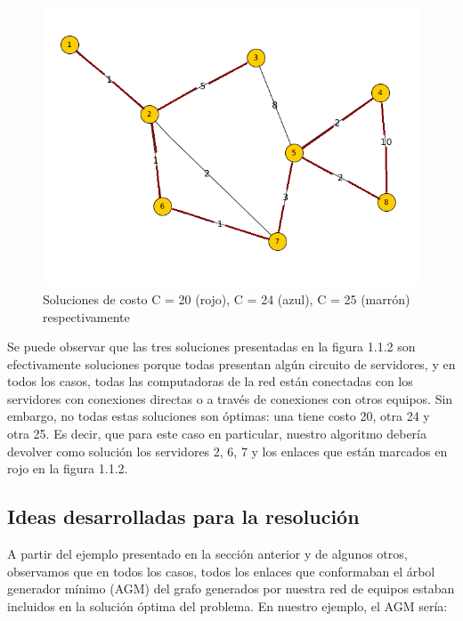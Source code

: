\documentclass[11pt, a4paper, twoside]{article}
\begin{document}
\begin{figure}[H]
\includegraphics[scale=1]{imagenes/equipos5.png}
\caption{Soluciones de costo C = 20 (rojo), C = 24 (azul), C = 25 (marrón) respectivamente}
\end{figure}

Se puede observar que las tres soluciones presentadas en la figura 1.1.2 
son efectivamente soluciones porque todas presentan algún circuito de
servidores, y en todos los casos, todas las computadoras de la red están 
conectadas con los servidores con conexiones directas o a través de conexiones
con otros equipos. Sin embargo, no todas estas soluciones son óptimas: una 
tiene costo 20, otra 24 y otra 25. Es decir, que para este caso en particular,
nuestro algoritmo debería devolver como solución los servidores 2, 6, 7 y
los enlaces que están marcados en rojo en la figura 1.1.2.

\subsection{Ideas desarrolladas para la resolución}
A partir del ejemplo presentado en la sección anterior y de algunos otros,
observamos que en todos los casos, todos los enlaces que conformaban el 
árbol generador mínimo (AGM) del grafo generados por nuestra red de equipos
estaban incluidos en la solución óptima del problema. En nuestro ejemplo,
el AGM sería:
\end{document}
